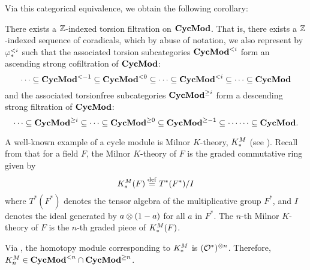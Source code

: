 Via this categorical equivalence, we obtain the following
corollary: 
\begin{cor}\label{cor_tor_filt_on_CycMod}
There exists a $\mathbb{Z}$-indexed torsion filtration on $\mathbf{CycMod}$. That
is, there exists a $\mathbb{Z}$-indexed sequence of coradicals, which by abuse
of notation, we also represent by $\varphi^{< i}_{*}$ such that the 
associated torsion subcategories $\mathbf{CycMod}^{< i}$ form an ascending 
strong cofiltration of $\mathbf{CycMod}$:
\[
\cdots \subseteq \mathbf{CycMod}^{< -1} \subseteq \mathbf{CycMod}^{< 0} \subseteq \cdots 
   \subseteq \mathbf{CycMod}^{< i} \subseteq \cdots 
   \subseteq \mathbf{CycMod}
\]
and the associated torsionfree subcategories $\mathbf{CycMod}^{\geq i}$
form a descending strong filtration of $\mathbf{CycMod}$:
\[
\cdots \subseteq \mathbf{CycMod}^{\geq i} \subseteq 
   \cdots \subseteq \mathbf{CycMod}^{\geq 0} \subseteq \mathbf{CycMod}^{\geq -1} \subseteq \cdots
   \cdots \subseteq \mathbf{CycMod}.
\]
\end{cor}

\begin{ex}\label{ex_milK}
A well-known example of a cycle module is Milnor $K$-theory,
$K^M_*$ (see \cite[1.4, 2.5]{Rost96}). Recall from \cite{MilK} that 
for a field $F$, the Milnor $K$-theory of $F$ is the graded 
commutative ring given by
\[
K^M_*(F) \stackrel{\mathrm{def}}{=} T^*(F^*)/I
\]
where $T^*(F^*)$ denotes the tensor algebra of the multiplicative 
group $F^*$, and $I$ denotes the ideal generated by $a \otimes 
(1 - a)$ for all $a$ in $F^*$. The $n$-th Milnor $K$-theory of $F$ 
is the $n$-th graded piece of $K^M_*(F)$.

Via \cite[3.7]{DegModHom}, the homotopy module corresponding to 
$K^M_*$ is $(\mathcal{O}^*)^{\otimes n}$. Therefore, $K^M_n \in
\mathbf{CycMod}^{< n} \cap \mathbf{CycMod}^{\geq n}$.
\end{ex}

%
